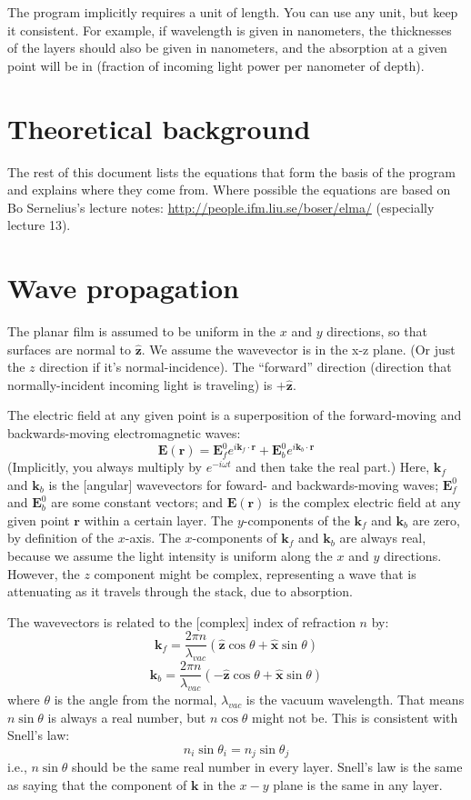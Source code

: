 \documentclass[12pt]{article}
\renewcommand{\(}{\left(}
\renewcommand{\)}{\right)}
\newcommand{\E}{\mathbf{E}}
\renewcommand{\k}{\mathbf{k}}
\renewcommand{\r}{\mathbf{r}}
\newcommand{\x}{\hat{\mathbf{x}}}
\newcommand{\z}{\hat{\mathbf{z}}}
\begin{document}
The program implicitly requires a unit of length. You can use any unit, but keep it consistent. For example, if wavelength is given in nanometers, the thicknesses of the layers should also be given in nanometers, and the absorption at a given point will be in (fraction of incoming light power per nanometer of depth).

\section{Theoretical background}

The rest of this document lists the equations that form the basis of the program and explains where they come from. Where possible the equations are based on Bo Sernelius's lecture notes: \url{http://people.ifm.liu.se/boser/elma/} (especially lecture 13).

\section{Wave propagation}

The planar film is assumed to be uniform in the $x$ and $y$ directions, so that surfaces are normal to $\z$. We assume the wavevector is in the x-z plane. (Or just the $z$ direction if it's normal-incidence). The ``forward'' direction (direction that normally-incident incoming light is traveling) is $+\z$.

The electric field at any given point is a superposition of the forward-moving and backwards-moving electromagnetic waves:
$$\E(\r) = \E_f^0 e^{i\k_f\cdot\r} + \E_b^0 e^{i\k_b\cdot\r}$$
(Implicitly, you always multiply by $e^{-i\omega t}$ and  then take the real part.) Here, $\k_f$ and $\k_b$ is the [angular] wavevectors for foward- and backwards-moving waves; $\E_f^0$ and $\E_b^0$ are some constant vectors; and $\E(\r)$ is the complex electric field at any given point $\r$ within a certain layer. The $y$-components of the $\k_f$ and $\k_b$ are zero, by definition of the $x$-axis. The $x$-components of $\k_f$ and $\k_b$ are always  real, because we assume the light intensity is uniform along the $x$ and $y$ directions. However, the $z$ component might be complex, representing a wave that is attenuating as it travels through the stack, due to absorption.

The wavevectors is related to the [complex] index of refraction $n$ by:
$$\k_f = \frac{2\pi n}{\lambda_{vac}}(\z \cos \theta + \x \sin \theta)$$
$$\k_b = \frac{2\pi n}{\lambda_{vac}}(-\z \cos \theta + \x \sin \theta)$$
where $\theta$ is the angle from the normal, $\lambda_{vac}$ is the vacuum wavelength. That means $n \sin \theta$ is always a real number, but $n \cos \theta$ might not be. This is consistent with Snell's law:
$$n_i \sin \theta_i = n_j \sin \theta_j$$
i.e., $n\sin \theta$ should be the same real number in every layer. Snell's law is the same as saying that the component of $\k$ in the $x-y$ plane is the same in any layer.
\end{document}
